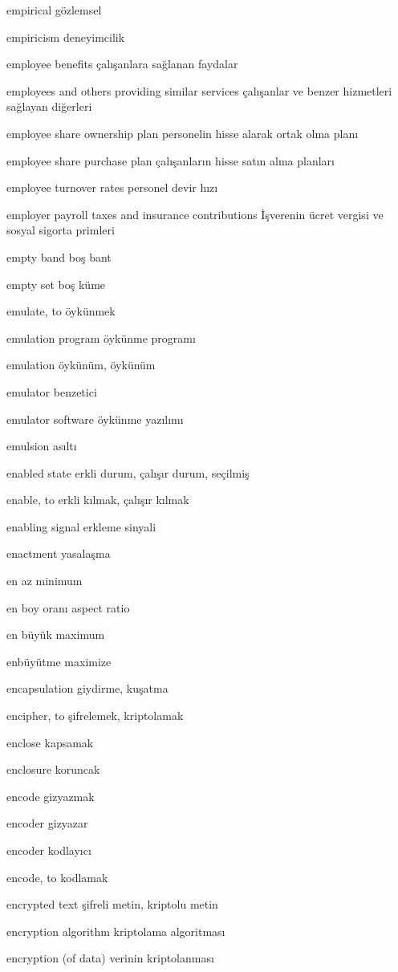 \documentclass[12pt,fleqn]{article}\usepackage{../../common}
\begin{document}
empirical gözlemsel

empiricism deneyimcilik

employee benefits çalışanlara sağlanan faydalar

employees and others providing similar services çalışanlar ve benzer hizmetleri sağlayan diğerleri

employee share ownership plan personelin hisse alarak ortak olma planı

employee share purchase plan çalışanların hisse satın alma planları

employee turnover rates personel devir hızı

employer payroll taxes and insurance contributions İşverenin ücret vergisi ve sosyal sigorta primleri

empty band boş bant

empty set boş küme

emulate, to öykünmek

emulation program öykünme programı

emulation öykünüm, öykünüm

emulator benzetici

emulator software öykünme yazılımı

emulsion asıltı

enabled state erkli durum, çalışır durum, seçilmiş

enable, to erkli kılmak, çalışır kılmak

enabling signal erkleme sinyali

enactment yasalaşma

en az minimum

en boy oranı aspect ratio

en büyük maximum

enbüyütme maximize

encapsulation giydirme, kuşatma

encipher, to şifrelemek, kriptolamak

enclose kapsamak

enclosure koruncak

encode gizyazmak

encoder gizyazar

encoder kodlayıcı

encode, to kodlamak

encrypted text şifreli metin, kriptolu metin

encryption algorithm kriptolama algoritması

encryption (of data) verinin kriptolanması
\end{document}

